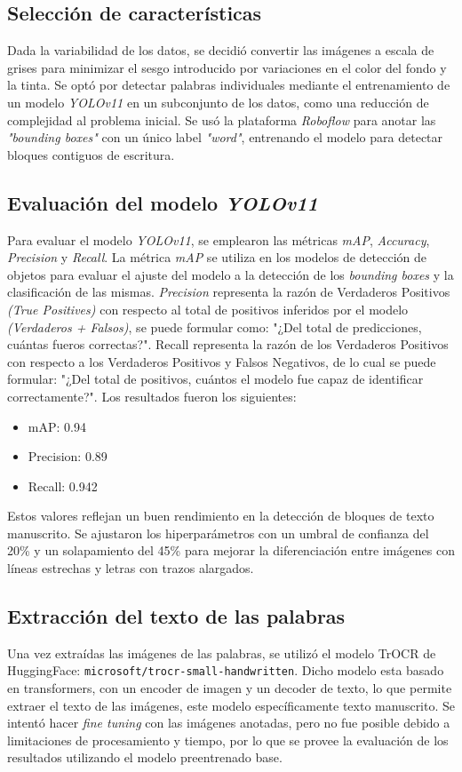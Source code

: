 \documentclass[11pt,a4paper]{article}
\begin{document}
\subsection{Selección de características}
Dada la variabilidad de los datos, se decidió convertir las imágenes a escala de grises para minimizar el sesgo introducido por variaciones en el color del fondo y la tinta. 
Se optó por detectar palabras individuales mediante el entrenamiento de un modelo \textit{YOLOv11} en un subconjunto de los datos, como una reducción de complejidad al problema inicial. 
Se usó la plataforma \textit{Roboflow} para anotar las \textit{"bounding boxes"} con un único label \textit{"word"}, entrenando el modelo para detectar bloques contiguos de escritura.

\subsection{Evaluación del modelo \textit{YOLOv11}}
Para evaluar el modelo \textit{YOLOv11}, se emplearon las métricas \textit{mAP}, \textit{Accuracy}, \textit{Precision} y \textit{Recall}. 
La métrica \textit{mAP} se utiliza en los modelos de detección de objetos para evaluar el ajuste del modelo a la detección de los \textit{bounding boxes} y la clasificación de las mismas. 
\textit{Precision} representa la razón de Verdaderos Positivos \textit{(True Positives)} con respecto al total de positivos inferidos por el modelo \textit{(Verdaderos + Falsos)}, 
se puede formular como: "¿Del total de predicciones, cuántas fueros correctas?". 
Recall representa la razón de los Verdaderos Positivos con respecto a los Verdaderos Positivos y Falsos Negativos, de lo cual se puede formular: "¿Del total de positivos, cuántos el modelo fue capaz de identificar correctamente?". 
Los resultados fueron los siguientes:

\begin{itemize}
    \item mAP: 0.94
    \item Precision: 0.89
    \item Recall: 0.942
\end{itemize}

Estos valores reflejan un buen rendimiento en la detección de bloques de texto manuscrito. 
Se ajustaron los hiperparámetros con un umbral de confianza del 20\% y un solapamiento del 45\% para mejorar la diferenciación entre imágenes con líneas estrechas y letras con trazos alargados.

\subsection{Extracción del texto de las palabras}
Una vez extraídas las imágenes de las palabras, se utilizó el modelo TrOCR de HuggingFace: \texttt{microsoft/trocr-small-handwritten}. 
Dicho modelo esta basado en transformers, con un encoder de imagen y un decoder de texto, lo que permite extraer el texto de las imágenes, este modelo específicamente texto manuscrito.
Se intentó hacer \textit{fine tuning} con las imágenes anotadas, pero no fue posible debido a limitaciones de procesamiento y tiempo, por lo que se provee la evaluación de los resultados utilizando el modelo preentrenado base.
\end{document}
